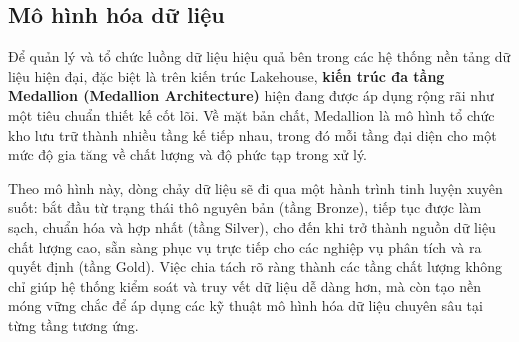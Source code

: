 \begin{table}[H]
    \centering
    \renewcommand{\arraystretch}{1.4}
    \caption{So sánh đặc điểm của Data Warehouse, Data Lake và Lakehouse}
\end{table}


\subsection{Mô hình hóa dữ liệu }
Để quản lý và tổ chức luồng dữ liệu hiệu quả bên trong các hệ thống nền tảng dữ liệu hiện đại, đặc biệt là trên kiến trúc Lakehouse, \textbf{kiến trúc đa tầng Medallion (Medallion Architecture)} hiện đang được áp dụng rộng rãi như một tiêu chuẩn thiết kế cốt lõi. Về mặt bản chất, Medallion là mô hình tổ chức kho lưu trữ thành nhiều tầng kế tiếp nhau, trong đó mỗi tầng đại diện cho một mức độ gia tăng về chất lượng và độ phức tạp trong xử lý. 

Theo mô hình này, dòng chảy dữ liệu sẽ đi qua một hành trình tinh luyện xuyên suốt: bắt đầu từ trạng thái thô nguyên bản (tầng Bronze), tiếp tục được làm sạch, chuẩn hóa và hợp nhất (tầng Silver), cho đến khi trở thành nguồn dữ liệu chất lượng cao, sẵn sàng phục vụ trực tiếp cho các nghiệp vụ phân tích và ra quyết định (tầng Gold). Việc chia tách rõ ràng thành các tầng chất lượng không chỉ giúp hệ thống kiểm soát và truy vết dữ liệu dễ dàng hơn, mà còn tạo nền móng vững chắc để áp dụng các kỹ thuật mô hình hóa dữ liệu chuyên sâu tại từng tầng tương ứng.

